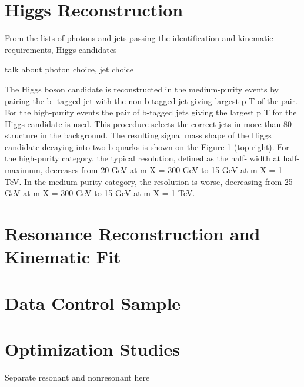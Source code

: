 \section{Higgs Reconstruction\label{sec:higgsreconstruction}}

From the lists of photons and jets passing the identification and kinematic requirements, Higgs
candidates 

talk about photon choice, jet choice

The  Higgs  boson  candidate  is  reconstructed  in  the  medium-purity  events  by  pairing  the  b-
tagged jet with the non b-tagged jet giving largest
p
T
of the pair.  For the high-purity events
the pair of b-tagged jets giving the largest
p
T
for the Higgs candidate is used.  This procedure
selects the correct jets in more than 80%
structure in the background.
The resulting signal mass shape of the Higgs candidate decaying into two b-quarks is shown on
the Figure 1 (top-right). For the high-purity category, the typical resolution, defined as the half-
width at half-maximum, decreases from 20 GeV at
m
X
=
300 GeV to 15 GeV at
m
X
=
1 TeV. In
the medium-purity category, the resolution is worse, decreasing from 25 GeV at
m
X
=
300 GeV
to 15 GeV at
m
X
=
1 TeV.



\section{Resonance Reconstruction and Kinematic Fit\label{sec:Xreconstruction}}

\section{Data Control Sample\label{sec:dataCS}}

\section{Optimization Studies\label{sec:optim}}
Separate resonant and nonresonant here


